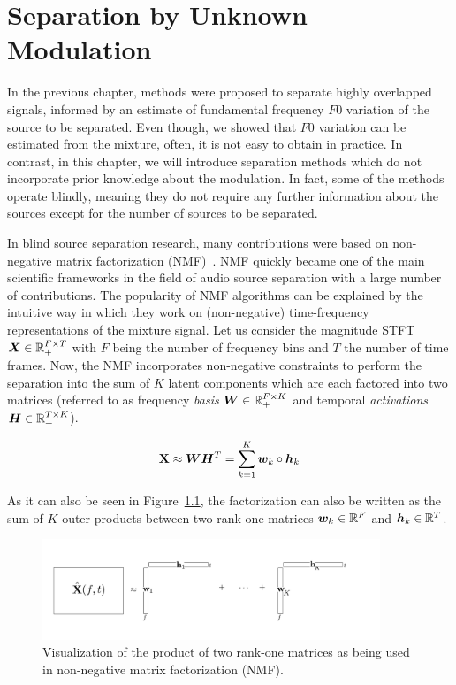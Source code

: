 \chapter{Separation by Unknown Modulation}
\label{cha:unknown}

In the previous chapter, methods were proposed to separate highly overlapped signals, informed by an estimate of fundamental frequency \(F0\) variation of the source to be separated.
Even though, we showed that \(F0\)  variation can be estimated from the mixture, often, it is not easy to obtain in practice.
In contrast, in this chapter, we will introduce separation methods which do not incorporate prior knowledge about the modulation. 
In fact, some of the methods operate blindly, meaning they do not require any further information about the sources except for the number of sources to be separated.
\par
In blind source separation research, many contributions were based on non-negative matrix factorization (NMF)~\cite{lee99, lee01}.
NMF quickly became one of the main scientific frameworks in the field of audio source separation with a large number of contributions.
The popularity of NMF algorithms can be explained by the intuitive way in which they work on (non-negative) time-frequency representations of the mixture signal.
Let us consider the magnitude STFT \({\bm{X}} \in {\mathbb{R}}_{+}^{F \times T}\) with \(F\) being the number of frequency bins and \(T\) the number of time frames.
Now, the NMF incorporates non-negative constraints to perform the separation into the sum of \(K\) latent components which are each factored into two matrices (referred to as frequency \emph{basis} \({\bm{W}} \in {\mathbb{R}}_{+}^ { F \times K }\) and temporal \emph{activations} \({\bm{H}} \in {\mathbb{R}}_{+}^ { T \times K }\)). 

\begin{equation}
   \mathbf{X} \approx {\bm{W}} {\bm{H}}^{T} = \sum\limits_{k=1}^{K} {\bm{w}}_{k} \circ {\bm{h}}_{k}
   \label{eq:vanilla_nmf}
\end{equation}

As it can also be seen in Figure~\ref{fig:nmf}, the factorization can also be
written as the sum of \(K\) outer products between two rank-one matrices \({\bm{w}}_k \in {\mathbb{R}}^F\)
and \({\bm{h}}_k \in {\mathbb{R}}^T\).

\begin{figure}[ht]
  \centering
  \includegraphics[width=0.9\textwidth]{Chapters/06_Separation_Unknown/figures/nmf.pdf}
  \caption{Visualization of the product of two rank-one matrices as being used in non-negative matrix factorization (NMF).}
  \label{fig:nmf}
\end{figure}

